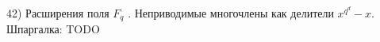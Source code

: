 42) Расширения поля $F_q$ . Неприводимые многочлены как делители $x^{q^d} - x$.\\
Шпаргалка: TODO\\

